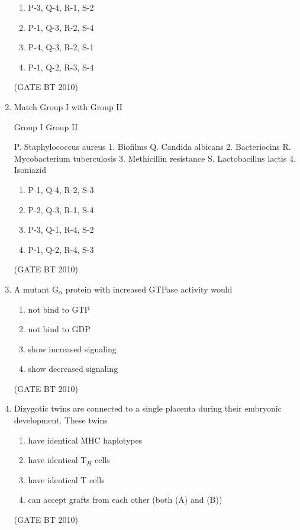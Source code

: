 \documentclass[journal,12pt,onecolumn]{IEEEtran}
\theoremstyle{remark}
\begin{document}
\begin{enumerate}
\begin{enumerate}
   \item P-3, Q-4, R-1, S-2  
   \item P-1, Q-3, R-2, S-4  
   \item P-4, Q-3, R-2, S-1  
   \item P-1, Q-2, R-3, S-4  
\end{enumerate}
\hfill (GATE BT 2010)

\item Match Group I with Group II  

Group I \hspace{3.5cm} Group II  

P. Staphylococcus aureus \hspace{2.0cm} 1. Biofilms  
Q. Candida albicans \hspace{2.8cm} 2. Bacteriocins  
R. Mycobacterium tuberculosis \hspace{1.2cm} 3. Methicillin resistance  
S. Lactobacillus lactis \hspace{2.1cm} 4. Isoniazid  

\begin{enumerate}
   \item P-1, Q-4, R-2, S-3  
   \item P-2, Q-3, R-1, S-4  
   \item P-3, Q-1, R-4, S-2  
   \item P-1, Q-2, R-4, S-3  
\end{enumerate}
\hfill (GATE BT 2010)

\item A mutant G$_{\alpha}$ protein with increased GTPase activity would  

\begin{enumerate}
   \item not bind to GTP  
   \item not bind to GDP  
   \item show increased signaling  
   \item show decreased signaling  
\end{enumerate}
\hfill (GATE BT 2010)

\item Dizygotic twins are connected to a single placenta during their embryonic development. These twins  

\begin{enumerate}
   \item have identical MHC haplotypes  
   \item have identical T$_H$ cells  
   \item have identical T cells  
   \item can accept grafts from each other (both (A) and (B))  
\end{enumerate}
\hfill (GATE BT 2010)


\end{enumerate}
\end{document}
